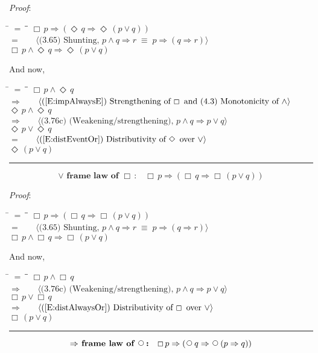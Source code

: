 \documentclass[12pt, fleqn, leqno]{article}
\newcommand{\lgap}{2pt}                             %
\newcommand{\mymathindent}{24pt}                    %
\newcommand{\equivs}{\ensuremath{\;\equiv\;}}       %
\newcommand{\impl}{\ensuremath{\Rightarrow}}        %
\newcommand{\Next}{\;\,\text{\raisebox{3.5pt}{\circle{6}}}}
\newcommand{\Event}{\Diamond\,}
\newcommand{\Always}{\Box\,}
\newcommand{\myqed}{\rule[-.23ex]{1.2ex}{2.0ex}}
\newcommand{\myqedtab}{\hspace{384pt}}              %
\newcommand{\Gll} {\langle}                         %
\newcommand{\Ggg} {\rangle}                         %
\newcommand{\Hint}[1]     {\ \ \ $\Gll              \mbox{#1} \Ggg$ }   %
\begin{document}
\emph{Proof}:
\begin{tabbing}
\hspace{\mymathindent} \= $= \;$ \= \myqedtab \= \kill
  \> \>   $\Always p \impl (\Event q \impl \Event (p \lor q))$\\[\lgap]
  \> $=$  \>  \Hint{(3.65) Shunting, $p\land q\impl r\equivs p\impl (q\impl r)$}\\[\lgap]
  \> \>   $\Always p \land \Event q \impl \Event (p \lor q)$
\end{tabbing}
And now,
\begin{tabbing}
\hspace{\mymathindent} \= $= \;$ \= \myqedtab \= \kill
  \> \>   $\Always p \land \Event q $\\[\lgap]
  \> $\impl$  \>  \Hint{(\ref{E:impAlwaysE}) Strengthening of $\Always$ and (4.3) Monotonicity of $\land$}\\[\lgap]
  \> \>   $\Event p \land \Event q $\\[\lgap]
   \> $\impl$ \> \Hint{(3.76c) (Weakening/strengthening), $p\land q \impl p \lor q$} \\[\lgap]
   \> \>   $\Event p \lor \Event q $\\[\lgap]
  \> $=$  \>  \Hint{(\ref{E:distEventOr}) Distributivity of $\Event$ over $\lor$}\\[\lgap]
  \> \>   $\Event (p \lor q)$\quad \myqed
\end{tabbing}
\begin{equation}\label{E:disjframelawAlways}
\textbf{$\lor$ frame law of $\Always$:}\quad \Always p \impl (\Always q \impl \Always (p \lor q))
\end{equation}

\emph{Proof}:
\begin{tabbing}
\hspace{\mymathindent} \= $= \;$ \= \myqedtab \= \kill
  \> \>   $\Always p \impl (\Always q \impl \Always (p \lor q))$\\[\lgap]
  \> $=$  \>  \Hint{(3.65) Shunting, $p\land q\impl r\equivs p\impl (q\impl r)$}\\[\lgap]
  \> \>   $\Always p \land \Always q \impl \Always (p \lor q)$
\end{tabbing}
And now,
\begin{tabbing}
\hspace{\mymathindent} \= $= \;$ \= \myqedtab \= \kill
  \> \>   $\Always p \land \Always q $\\[\lgap]
   \> $\impl$ \> \Hint{(3.76c) (Weakening/strengthening), $p\land q \impl p \lor q$} \\[\lgap]
   \> \>   $\Always p \lor \Always q $\\[\lgap]
  \> $\impl$  \>  \Hint{(\ref{E:distAlwaysOr}) Distributivity of $\Always$ over $\lor$}\\[\lgap]
  \> \>   $\Always (p \lor q)$\quad \myqed
\end{tabbing}
\begin{equation}\label{E:implframelawnext}
\textbf{$\impl$ frame law of $\Next$:}\quad \Always p \impl (\Next q \impl \Next (p \impl q))
\end{equation}
\end{document}
